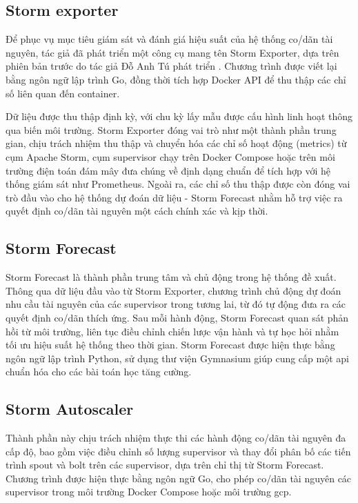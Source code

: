 \subsection{Storm exporter}

Để phục vụ mục tiêu giám sát và đánh giá hiệu suất của hệ thống co/dãn tài nguyên, tác giả đã phát triển một công cụ mang tên Storm Exporter, dựa trên phiên bản trước do tác giả Đỗ Anh Tú phát triển \autocite{mr4x2stormexporterprometheus}. Chương trình được viết lại bằng ngôn ngữ lập trình Go, đồng thời tích hợp Docker API để thu thập các chỉ số liên quan đến container.

Dữ liệu được thu thập định kỳ, với chu kỳ lấy mẫu được cấu hình linh hoạt thông qua biến môi trường. Storm Exporter đóng vai trò như một thành phần trung gian, chịu trách nhiệm thu thập và chuyển hóa các chỉ số hoạt động (metrics) từ cụm Apache Storm, cụm supervisor chạy trên Docker Compose hoặc trên môi trường điện toán đám mây đưa chúng về định dạng chuẩn để tích hợp với hệ thống giám sát như Prometheus. Ngoài ra, các chỉ số thu thập được còn đóng vai trò đầu vào cho hệ thống dự đoán dữ liệu - Storm Forecast nhằm hỗ trợ việc ra quyết định co/dãn tài nguyên một cách chính xác và kịp thời.

\subsection{Storm Forecast}

Storm Forecast là thành phần trung tâm và chủ động trong hệ thống đề xuất. Thông qua dữ liệu đầu vào từ Storm Exporter, chương trình chủ động dự đoán nhu cầu tài nguyên của các supervisor trong tương lai, từ đó tự động đưa ra các quyết định co/dãn thích ứng. Sau mỗi hành động, Storm Forecast quan sát phản hồi từ môi trường, liên tục điều chỉnh chiến lược vận hành và tự học hỏi nhằm tối ưu hiệu suất hệ thống theo thời gian. Storm Forecast được hiện thực bằng ngôn ngữ lập trình Python, sử dụng thư viện Gymnasium \autocite{gymnasium} giúp cung cấp một \gls{api} chuẩn hóa cho các bài toán học tăng cường.

\subsection{Storm Autoscaler}

Thành phần này chịu trách nhiệm thực thi các hành động co/dãn tài nguyên đa cấp độ, bao gồm việc điều chỉnh số lượng supervisor và thay đổi phân bố các tiến trình spout và bolt trên các supervisor, dựa trên chỉ thị từ Storm Forecast. Chương trình được hiện thực bằng ngôn ngữ Go, cho phép co/dãn tài nguyên các supervisor trong môi trường Docker Compose hoặc môi trường \gls{gcp}.

